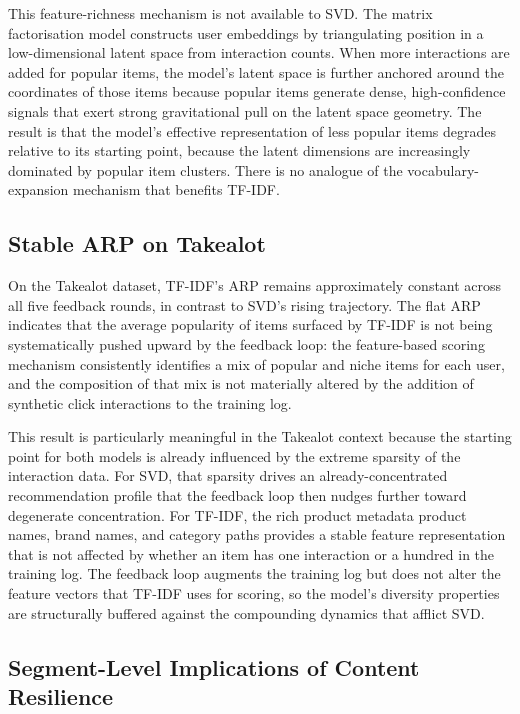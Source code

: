 \documentclass[11pt,a4paper]{report}
\begin{document}
This feature-richness mechanism is not available to SVD. The matrix factorisation model constructs user embeddings by triangulating position in a low-dimensional latent space from interaction counts. When more interactions are added for popular items, the model's latent space is further anchored around the coordinates of those items because popular items generate dense, high-confidence signals that exert strong gravitational pull on the latent space geometry. The result is that the model's effective representation of less popular items degrades relative to its starting point, because the latent dimensions are increasingly dominated by popular item clusters. There is no analogue of the vocabulary-expansion mechanism that benefits TF-IDF.

\subsection*{Stable ARP on Takealot}

On the Takealot dataset, TF-IDF's ARP remains approximately constant across all five feedback rounds, in contrast to SVD's rising trajectory. The flat ARP indicates that the average popularity of items surfaced by TF-IDF is not being systematically pushed upward by the feedback loop: the feature-based scoring mechanism consistently identifies a mix of popular and niche items for each user, and the composition of that mix is not materially altered by the addition of synthetic click interactions to the training log.

This result is particularly meaningful in the Takealot context because the starting point for both models is already influenced by the extreme sparsity of the interaction data. For SVD, that sparsity drives an already-concentrated recommendation profile that the feedback loop then nudges further toward degenerate concentration. For TF-IDF, the rich product metadata product names, brand names, and category paths provides a stable feature representation that is not affected by whether an item has one interaction or a hundred in the training log. The feedback loop augments the training log but does not alter the feature vectors that TF-IDF uses for scoring, so the model's diversity properties are structurally buffered against the compounding dynamics that afflict SVD.

\subsection*{Segment-Level Implications of Content Resilience}
\end{document}
